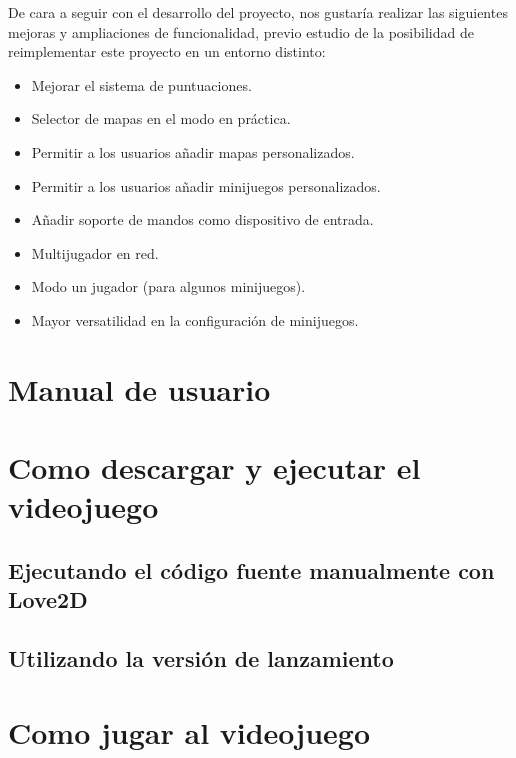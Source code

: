 \documentclass[12pt, spanish]{article}
\begin{document}
De cara a seguir con el desarrollo del proyecto, nos gustaría realizar las siguientes mejoras y ampliaciones de funcionalidad, previo estudio de la posibilidad de reimplementar este proyecto en un entorno distinto:

\begin{itemize}
	\item Mejorar el sistema de puntuaciones.
	\item Selector de mapas en el modo en práctica.
	\item Permitir a los usuarios añadir mapas personalizados.
	\item Permitir a los usuarios añadir minijuegos personalizados.
	\item Añadir soporte de mandos como dispositivo de entrada.
	\item Multijugador en red.
	\item Modo un jugador (para algunos minijuegos).
	\item Mayor versatilidad en la configuración de minijuegos.
\end{itemize}


\section*{Manual de usuario}
\label{sec:manual}


\section{Como descargar y ejecutar el videojuego}

\subsection{Ejecutando el código fuente manualmente con Love2D}

\subsection{Utilizando la versión de lanzamiento}

\section{Como jugar al videojuego}
\end{document}

